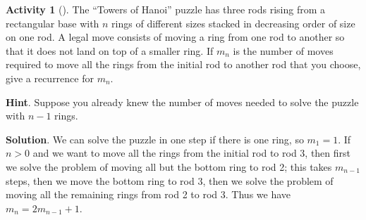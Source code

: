 \documentclass[10pt,]{book}
\theoremstyle{plain}
\theoremstyle{definition}
\theoremstyle{definition}
\theoremstyle{definition}
\newtheorem{activity}[project]{Activity}
\numberwithin{equation}{chapter}
\begin{document}
\begin{activity}[]\label{HanoiProblem}
\hypertarget{p-900}{}%
The ``Towers of Hanoi'' puzzle has three rods rising from a rectangular base with \(n\) rings of different sizes stacked in decreasing order of size on one rod. A legal move consists of moving a ring from one rod to another so that it does not land on top of a smaller ring. If \(m_n\) is the number of moves required to move all the rings from the initial rod to another rod that you choose, give a recurrence for \(m_n\).%
\par\smallskip%
\noindent\textbf{Hint}.\hypertarget{hint-95}{}\quad%
\hypertarget{p-901}{}%
Suppose you already knew the number of moves needed to solve the puzzle with \(n-1\) rings.%
\par\smallskip%
\noindent\textbf{Solution}.\hypertarget{solution-73}{}\quad%
\hypertarget{p-902}{}%
We can solve the puzzle in one step if there is one ring, so \(m_1=1\). If \(n>0\) and we want to move all the rings from the initial rod to rod 3, then first we solve the problem of moving all but the bottom ring to rod 2; this takes \(m_{n-1}\) steps, then we move the bottom ring to rod 3, then we solve the problem of moving all the remaining rings from rod 2 to rod 3. Thus we have \(m_n=2m_{n-1}+1\).%
\end{activity}
\end{document}
